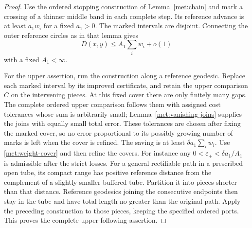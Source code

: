 \begin{proof}
Use the ordered stopping construction of Lemma~\ref{met:chain} and
mark a crossing of a thinner middle band in each complete step.  Its
reference advance is at least $a_1w_i$ for a fixed $a_1>0$.
The marked intervals are disjoint.  Connecting the outer reference
circles as in that lemma gives
\begin{equation}
 D(x,y)\leq A_1\sum_iw_i+o(1)
 \label{met:weight-cover}
\end{equation}
with a fixed $A_1<\infty$.

For the upper assertion, run the construction along a reference
geodesic.  Replace each marked interval by its improved certificate,
and retain the upper comparison $C$ on the intervening pieces.
At this fixed cover there are only finitely many gaps.  The complete
ordered upper comparison follows them with assigned cost tolerances
whose sum is arbitrarily small; Lemma~\ref{met:vanishing-joins}
supplies the joins with equally small total error.  These tolerances
are chosen after fixing the marked cover, so no error proportional
to its possibly growing number of marks is left when the cover is
refined.  The saving is at least
$\delta a_1\sum_iw_i$.  Use \eqref{met:weight-cover} and then refine
the covers.  For instance any
$0<\varepsilon_+<\delta a_1/A_1$ is admissible after the strict losses.
For a general rectifiable path in a prescribed open tube, its compact
range has positive reference distance from the complement of a
slightly smaller buffered tube.  Partition it into pieces shorter
than that distance.  Reference geodesics joining the consecutive
endpoints then stay in the tube and have total length no greater
than the original path.  Apply the preceding construction to those
pieces, keeping the specified ordered ports.  This proves the
complete upper-following assertion.


\end{proof}

